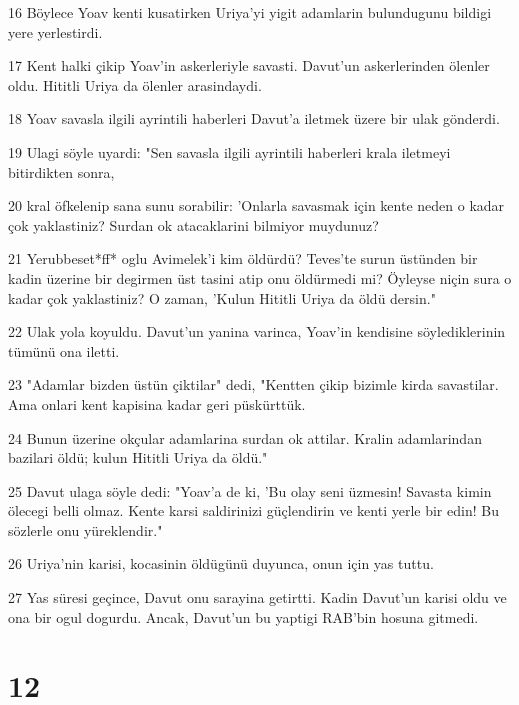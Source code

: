 \par 16 Böylece Yoav kenti kusatirken Uriya'yi yigit adamlarin bulundugunu bildigi yere yerlestirdi.
\par 17 Kent halki çikip Yoav'in askerleriyle savasti. Davut'un askerlerinden ölenler oldu. Hititli Uriya da ölenler arasindaydi.
\par 18 Yoav savasla ilgili ayrintili haberleri Davut'a iletmek üzere bir ulak gönderdi.
\par 19 Ulagi söyle uyardi: "Sen savasla ilgili ayrintili haberleri krala iletmeyi bitirdikten sonra,
\par 20 kral öfkelenip sana sunu sorabilir: 'Onlarla savasmak için kente neden o kadar çok yaklastiniz? Surdan ok atacaklarini bilmiyor muydunuz?
\par 21 Yerubbeset*ff* oglu Avimelek'i kim öldürdü? Teves'te surun üstünden bir kadin üzerine bir degirmen üst tasini atip onu öldürmedi mi? Öyleyse niçin sura o kadar çok yaklastiniz? O zaman, 'Kulun Hititli Uriya da öldü dersin."
\par 22 Ulak yola koyuldu. Davut'un yanina varinca, Yoav'in kendisine söylediklerinin tümünü ona iletti.
\par 23 "Adamlar bizden üstün çiktilar" dedi, "Kentten çikip bizimle kirda savastilar. Ama onlari kent kapisina kadar geri püskürttük.
\par 24 Bunun üzerine okçular adamlarina surdan ok attilar. Kralin adamlarindan bazilari öldü; kulun Hititli Uriya da öldü."
\par 25 Davut ulaga söyle dedi: "Yoav'a de ki, 'Bu olay seni üzmesin! Savasta kimin ölecegi belli olmaz. Kente karsi saldirinizi güçlendirin ve kenti yerle bir edin! Bu sözlerle onu yüreklendir."
\par 26 Uriya'nin karisi, kocasinin öldügünü duyunca, onun için yas tuttu.
\par 27 Yas süresi geçince, Davut onu sarayina getirtti. Kadin Davut'un karisi oldu ve ona bir ogul dogurdu. Ancak, Davut'un bu yaptigi RAB'bin hosuna gitmedi.

\chapter{12}


